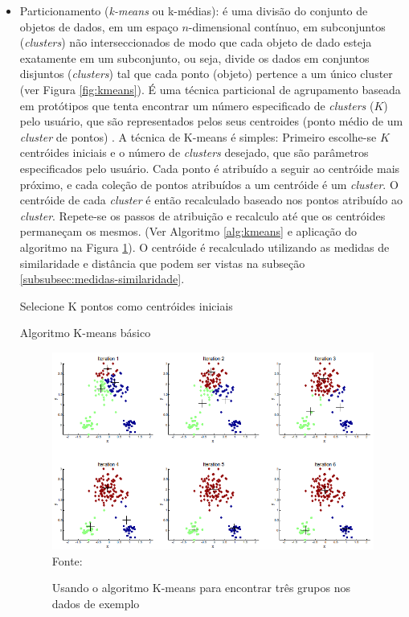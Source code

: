 \begin{itemize}
    \item Particionamento (\textit{k-means} ou k-médias): é uma divisão do conjunto de objetos de dados, em um espaço \textbf{\({n}\)}-dimensional contínuo, em subconjuntos (\textit{clusters}) não interseccionados de modo que cada objeto de dado esteja exatamente em um subconjunto, ou seja, divide os dados em conjuntos disjuntos (\textit{clusters}) tal que cada ponto (objeto) pertence a um único cluster (ver Figura \ref{fig:kmeans}). É uma técnica particional de agrupamento baseada em protótipos que tenta encontrar um número especificado de \textit{clusters} (\textbf{\({K}\)}) pelo usuário, que são representados pelos seus centroides (ponto médio de um \textit{cluster} de pontos) \cite{pang2009}. A técnica de K-means é simples: Primeiro escolhe-se \textbf{\({K}\)} centróides iniciais e o número de \textit{clusters} desejado, que são parâmetros especificados pelo usuário. Cada ponto é atribuído a seguir ao centróide mais próximo, e cada coleção de pontos atribuídos a um centróide é um \textit{cluster}. O centróide de cada \textit{cluster} é então recalculado baseado nos pontos atribuído ao \textit{cluster}. Repete-se os passos de atribuição e recalculo até que os centróides permaneçam os mesmos. (Ver Algoritmo \ref{alg:kmeans} e aplicação do algoritmo na Figura \ref{fig:kmeansIteration}). O centróide é recalculado utilizando as medidas de similaridade e distância que podem ser vistas na subseção \ref{subsubsec:medidas-similaridade}.
    
    \begin{algorithm}[!htb]
        \SetAlgoLined
        Selecione K pontos como centróides iniciais\;
    \caption{Algoritmo K-means básico}
    \label{alg:kmeans}
    \end{algorithm}
        
    \begin{figure}[!htb]
       \centering
       \caption{Usando o algoritmo K-means para encontrar três grupos nos dados de exemplo}\label{fig:kmeansIteration} 
       \includegraphics[scale=0.60]{figuras/iterationKmeans.png}
       \\Fonte: \cite{vania2018}
    \end{figure}
    

\end{itemize}
